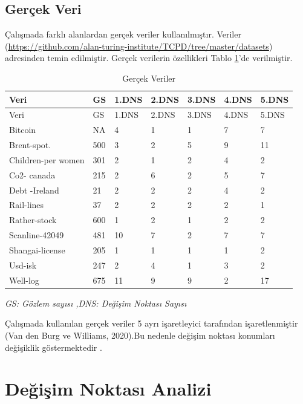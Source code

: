 \documentclass[12pt,twoside]{deuthesis}
\begin{document}
\hypertarget{geruxe7ek-veri}{%
\subsection{Gerçek Veri}\label{geruxe7ek-veri}}

Çalışmada farklı alanlardan gerçek veriler kullanılmıştır. Veriler (\url{https://github.com/alan-turing-institute/TCPD/tree/master/datasets}) adresinden temin edilmiştir. Gerçek verilerin özellikleri Tablo \ref{tab:ngercek}'de verilmiştir.

\begin{longtable}[]{@{}lllllll@{}}
\caption{\label{tab:ngercek} Gerçek Veriler}\tabularnewline
\toprule\noalign{}
Veri & GS & 1.DNS & 2.DNS & 3.DNS & 4.DNS & 5.DNS \\
\midrule\noalign{}
\endfirsthead
\toprule\noalign{}
Veri & GS & 1.DNS & 2.DNS & 3.DNS & 4.DNS & 5.DNS \\
\midrule\noalign{}
\endhead
\bottomrule\noalign{}
\endlastfoot
Bitcoin & NA & 4 & 1 & 1 & 7 & 7 \\
Brent-spot. & 500 & 3 & 2 & 5 & 9 & 11 \\
Children-per women & 301 & 2 & 1 & 2 & 4 & 2 \\
Co2- canada & 215 & 2 & 6 & 2 & 5 & 7 \\
Debt -Ireland & 21 & 2 & 2 & 2 & 4 & 2 \\
Rail-lines & 37 & 2 & 2 & 2 & 2 & 1 \\
Rather-stock & 600 & 1 & 2 & 1 & 2 & 2 \\
Scanline-42049 & 481 & 10 & 7 & 2 & 7 & 7 \\
Shangai-license & 205 & 1 & 1 & 1 & 1 & 2 \\
Usd-isk & 247 & 2 & 4 & 1 & 3 & 2 \\
Well-log & 675 & 11 & 9 & 9 & 2 & 17 \\
\end{longtable}

\emph{GS: Gözlem sayısı ,DNS: Değişim Noktası Sayısı}

Çalışmada kullanılan gerçek veriler 5 ayrı işaretleyici tarafından işaretlenmiştir (Van den Burg ve Williams, 2020).Bu nedenle değişim noktası konumları değişiklik göstermektedir .

\hypertarget{deux11fiux15fim-noktasux131-analizi}{%
\section{Değişim Noktası Analizi}\label{deux11fiux15fim-noktasux131-analizi}}
\end{document}
